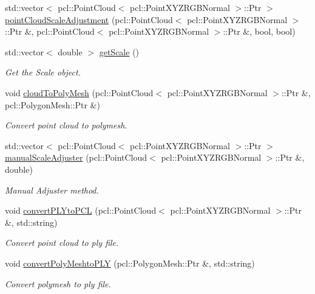 \begin{DoxyCompactItemize}
std\+::vector$<$ pcl\+::\+Point\+Cloud$<$ pcl\+::\+Point\+X\+Y\+Z\+R\+G\+B\+Normal $>$\+::Ptr $>$ \hyperlink{classReconstruction_a8e8b20ec9b384b9dad21a3accfea98f2}{point\+Cloud\+Scale\+Adjustment} (pcl\+::\+Point\+Cloud$<$ pcl\+::\+Point\+X\+Y\+Z\+R\+G\+B\+Normal $>$\+::Ptr \&, pcl\+::\+Point\+Cloud$<$ pcl\+::\+Point\+X\+Y\+Z\+R\+G\+B\+Normal $>$\+::Ptr \&, bool, bool)
\item 
std\+::vector$<$ double $>$ \hyperlink{classReconstruction_aa26b3c0a0b3739c330b2c48f874c15c9}{get\+Scale} ()
\begin{DoxyCompactList}\small\item\em Get the Scale object. \end{DoxyCompactList}\item 
void \hyperlink{classReconstruction_a1b7f0942d1540ace69e53c28d3b82023}{cloud\+To\+Poly\+Mesh} (pcl\+::\+Point\+Cloud$<$ pcl\+::\+Point\+X\+Y\+Z\+R\+G\+B\+Normal $>$\+::Ptr \&, pcl\+::\+Polygon\+Mesh\+::\+Ptr \&)
\begin{DoxyCompactList}\small\item\em Convert point cloud to polymesh. \end{DoxyCompactList}\item 
std\+::vector$<$ pcl\+::\+Point\+Cloud$<$ pcl\+::\+Point\+X\+Y\+Z\+R\+G\+B\+Normal $>$\+::Ptr $>$ \hyperlink{classReconstruction_a6c2151dd4224cee397adb2b353e20e9b}{manual\+Scale\+Adjuster} (pcl\+::\+Point\+Cloud$<$ pcl\+::\+Point\+X\+Y\+Z\+R\+G\+B\+Normal $>$\+::Ptr \&, double)
\begin{DoxyCompactList}\small\item\em Manual Adjuster method. \end{DoxyCompactList}\item 
void \hyperlink{classReconstruction_a46cab918422a3c74bced403043968992}{convert\+P\+L\+Yto\+P\+CL} (pcl\+::\+Point\+Cloud$<$ pcl\+::\+Point\+X\+Y\+Z\+R\+G\+B\+Normal $>$\+::Ptr \&, std\+::string)
\begin{DoxyCompactList}\small\item\em Convert point cloud to ply file. \end{DoxyCompactList}\item 
void \hyperlink{classReconstruction_afab7e493f5aee46722977acd64658c7a}{convert\+Poly\+Meshto\+P\+LY} (pcl\+::\+Polygon\+Mesh\+::\+Ptr \&, std\+::string)
\begin{DoxyCompactList}\small\item\em Convert polymesh to ply file. \end{DoxyCompactList}\item 

\end{DoxyCompactItemize}
